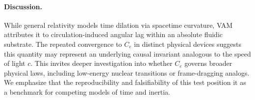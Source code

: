 \documentclass[12pt]{article}
\begin{document}
    \paragraph{Discussion.} While general relativity models time dilation via spacetime curvature, VAM attributes it to circulation-induced angular lag within an absolute fluidic substrate. The repeated convergence to $C_e$ in distinct physical devices suggests this quantity may represent an underlying causal invariant analogous to the speed of light $c$. This invites deeper investigation into whether $C_e$ governs broader physical laws, including low-energy nuclear transitions or frame-dragging analogs. We emphasize that the reproducibility and falsifiability of this test position it as a benchmark for competing models of time and inertia.



\ifdefined\standalonechapter\else


\end{document}
